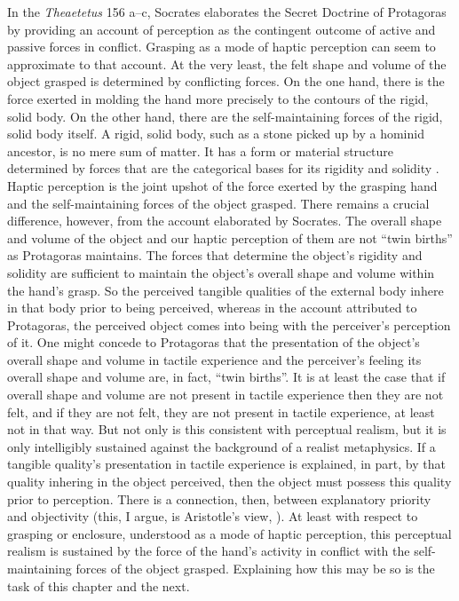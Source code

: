 In the \emph{Theaetetus} 156 a--c, Socrates elaborates the Secret Doctrine of Protagoras by providing an account of perception as the contingent outcome of active and passive forces in conflict. Grasping as a mode of haptic perception can seem to approximate to that account. At the very least, the felt shape and volume of the object grasped is determined by conflicting forces. On the one hand, there is the force exerted in molding the hand more precisely to the contours of the rigid, solid body. On the other hand, there are the self-maintaining forces of the rigid, solid body itself. A rigid, solid body, such as a stone picked up by a hominid ancestor, is no mere sum of matter. It has a form or material structure determined by forces that are the categorical bases for its rigidity and solidity \citep{Johnston:2006js}. Haptic perception is the joint upshot of the force exerted by the grasping hand and the self-maintaining forces of the object grasped. There remains a crucial difference, however, from the account elaborated by Socrates. The overall shape and volume of the object and our haptic perception of them are not ``twin births'' as Protagoras maintains. The forces that determine the object's rigidity and solidity are sufficient to maintain the object's overall shape and volume within the hand's grasp. So the perceived tangible qualities of the external body inhere in that body prior to being perceived, whereas in the account attributed to Protagoras, the perceived object comes into being with the perceiver's perception of it. One might concede to Protagoras that the presentation of the object's overall shape and volume in tactile experience and the perceiver's feeling its overall shape and volume are, in fact, ``twin births''. It is at least the case that if overall shape and volume are not present in tactile experience then they are not felt, and if they are not felt, they are not present in tactile experience, at least not in that way. But not only is this consistent with perceptual realism, but it is only intelligibly sustained against the background of a realist metaphysics. If a tangible quality's presentation in tactile experience is explained, in part, by that quality inhering in the object perceived, then the object must possess this quality prior to perception. There is a connection, then, between explanatory priority and objectivity (this, I argue, is Aristotle's view, \citealt{Kalderon:2015fr}). At least with respect to grasping or enclosure, understood as a mode of haptic perception, this perceptual realism is sustained by the force of the hand's activity in conflict with the self-maintaining forces of the object grasped. Explaining how this may be so is the task of this chapter and the next.

